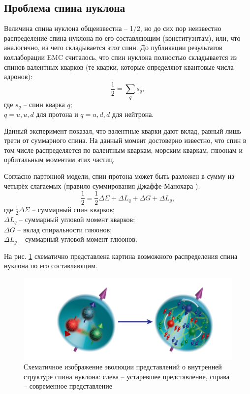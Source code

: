 \documentclass{extreport}
\begin{document}
\subsection{Проблема спина нуклона}
 Величина спина нуклона общеизвестна – 1/2, но до сих пор неизвестно распределение спина нуклона по его составляющим (конституэнтам), или, что аналогично, из чего складывается этот спин. До публикации результатов коллаборации EMC \cite{Arbuzov_2020} считалось, что спин нуклона полностью складывается из спинов валентных кварков (те кварки, которые определяют квантовые числа адронов):
 \begin{equation}
 	\frac{1}{2} = \sum_{q} s_q,
 \end{equation}
где $s_q$ -- спин кварка $q$; \\
$q = u, u, d$ для протона и $q = u, d, d$ для нейтрона.

Данный эксперимент показал, что валентные кварки дают вклад, равный лишь трети от суммарного спина. На данный момент достоверно известно, что спин в том числе распределяется по валентным кваркам, морским кваркам, глюонам и орбитальным моментам этих частиц. 
 
Согласно партонной модели, спин протона может быть разложен в сумму из четырёх слагаемых (правило суммирования Джаффе-Манохара \cite{Ji_2015}):
\begin{equation}
	\frac{1}{2} = \frac{1}{2} \Delta \Sigma + \Delta L_q + \Delta G + \Delta L_g,
\end{equation}
где $\frac{1}{2} \Delta \Sigma$ -- суммарный спин кварков; \\
$\Delta L_q$ -- суммарный угловой момент кварков; \\
$\Delta G$ -- вклад спиральности глюонов; \\
$\Delta L_g$ -- суммарный угловой момент глюонов.

 На рис. \ref{fig:nucleo} схематично представлена картина возможного распределения спина нуклона по его составляющим.
 
\begin{figure}[ht]
    \centering
    \includegraphics[width = 0.9\linewidth]{nucleo.png}
    \caption{Схематичное изображение эволюции представлений о внутренней структуре спина нуклона: слева – устаревшее представление, справа – современное представление}
    \label{fig:nucleo}
\end{figure}
 
\end{document}
